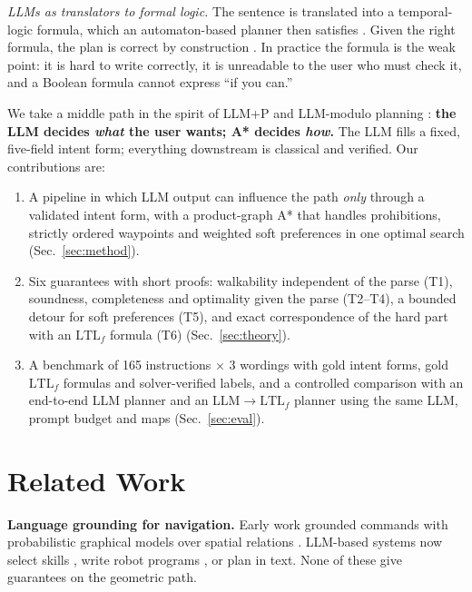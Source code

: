 \documentclass[letterpaper, 10 pt, conference]{ieeeconf}
\newcommand{\Lt}{\mathrm{LTL}_f}
\begin{document}
\emph{LLMs as translators to formal logic.} The sentence is translated into a
temporal-logic formula, which an automaton-based planner then satisfies
\cite{liu2023lang2ltl,fuggitti2023nl2ltl,cosler2023nl2spec,chen2024autotamp}. Given the
right formula, the plan is correct by construction \cite{kressgazit2009}. In practice
the formula is the weak point: it is hard to write correctly, it is unreadable to the
user who must check it, and a Boolean formula cannot express ``if you can.''

We take a middle path in the spirit of LLM+P \cite{liu2023llmp} and LLM-modulo
planning \cite{kambhampati2024}: \textbf{the LLM decides \emph{what} the user wants; A*
decides \emph{how}.} The LLM fills a fixed, five-field intent form; everything
downstream is classical and verified. Our contributions are:

\begin{enumerate}
\item A pipeline in which LLM output can influence the path \emph{only} through a
  validated intent form, with a product-graph A* that handles prohibitions, strictly
  ordered waypoints and weighted soft preferences in one optimal search (Sec.~\ref{sec:method}).
\item Six guarantees with short proofs: walkability independent of the parse (T1),
  soundness, completeness and optimality given the parse (T2--T4), a bounded detour
  for soft preferences (T5), and exact correspondence of the hard part with an $\Lt$
  formula (T6) (Sec.~\ref{sec:theory}).
\item A benchmark of 165 instructions $\times$ 3 wordings with gold intent forms, gold
  $\Lt$ formulas and solver-verified labels, and a controlled comparison with an
  end-to-end LLM planner and an LLM$\to\Lt$ planner using the same LLM, prompt
  budget and maps (Sec.~\ref{sec:eval}).
\end{enumerate}

\section{Related Work}

\textbf{Language grounding for navigation.} Early work grounded commands with
probabilistic graphical models over spatial relations \cite{tellex2011}. LLM-based
systems now select skills \cite{ahn2022saycan}, write robot programs
\cite{liang2023cap,singh2023progprompt}, or plan in text. None of these give
guarantees on the geometric path.
\end{document}
